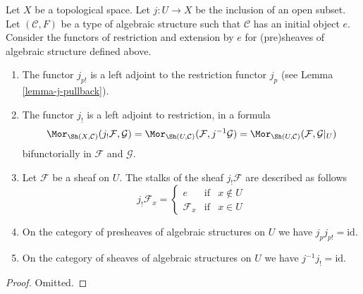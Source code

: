 \begin{lemma}
\label{lemma-j-shriek-structures}
Let $X$ be a topological space.
Let $j : U \to X$ be the inclusion of an open subset.
Let $(\mathcal{C}, F)$ be a type of algebraic structure
such that $\mathcal{C}$ has an initial object $e$.
Consider the functors of restriction and extension
by $e$ for (pre)sheaves of algebraic structure defined above.
\begin{enumerate}
\item The functor $j_{p!}$ is a left adjoint to the
restriction functor $j_p$ (see Lemma \ref{lemma-j-pullback}).
\item The functor $j_!$ is a left adjoint to restriction,
in a formula
$$
\Mor_{\Sh(X, \mathcal{C})}(j_!\mathcal{F}, \mathcal{G})
=
\Mor_{\Sh(U, \mathcal{C})}(\mathcal{F}, j^{-1}\mathcal{G})
=
\Mor_{\Sh(U, \mathcal{C})}(\mathcal{F}, \mathcal{G}|_U)
$$
bifunctorially in $\mathcal{F}$ and $\mathcal{G}$.
\item Let $\mathcal{F}$ be a sheaf on $U$.
The stalks of the sheaf $j_!\mathcal{F}$ are described
as follows
$$
j_{!}\mathcal{F}_x =
\left\{
\begin{matrix}
e & \text{if} & x \not \in U \\
\mathcal{F}_x & \text{if} & x \in U
\end{matrix}
\right.
$$
\item On the category of presheaves of algebraic structures on $U$
we have $j_pj_{p!} = \text{id}$.
\item On the category of sheaves of algebraic structures on $U$
we have $j^{-1}j_! = \text{id}$.
\end{enumerate}
\end{lemma}

\begin{proof}
Omitted.
\end{proof}

